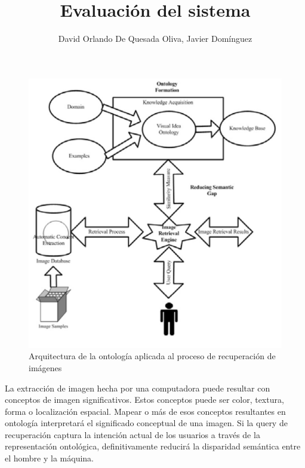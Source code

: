 \documentclass{llncs}
\begin{document}
\begin{figure}
    \caption{Arquitectura de la ontolog\'ia aplicada al proceso de recuperaci\'on de im\'agenes}
    \includegraphics[scale = .4]{./images/ontolgy-bases-image-retrieval-process.png}
\end{figure}

La extracci\'on de imagen hecha por una computadora puede resultar con conceptos de imagen 
significativos. Estos conceptos puede ser color, textura, forma o localizaci\'on espacial.
Mapear o m\'as de esos conceptos resultantes en ontolog\'ia interpretar\'a el significado 
conceptual de una imagen. Si la query de recuperaci\'on captura la intenci\'on actual de los
usuarios a trav\'es de la representaci\'on ontol\'ogica, definitivamente reducir\'a la disparidad 
sem\'antica entre el hombre y la m\'aquina.   

\noindent









\newpage



\title{Evaluación del sistema}
\author{David Orlando De Quesada Oliva, Javier Dom\'inguez}
\maketitle
\end{document}
